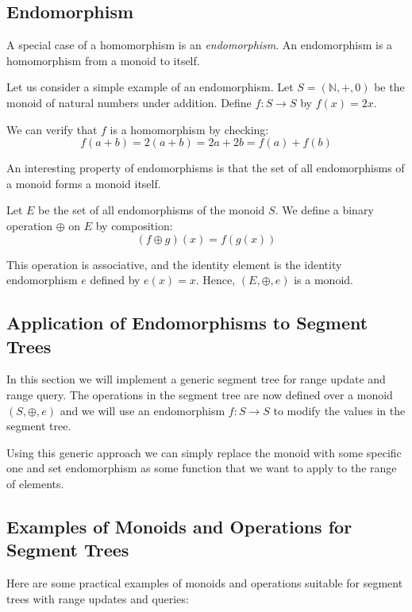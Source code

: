 \documentclass[11pt]{article}
\begin{document}
\subsection{Endomorphism}

A special case of a homomorphism is an \emph{endomorphism}.  
An endomorphism is a homomorphism from a monoid to itself.

Let us consider a simple example of an endomorphism.  
Let \( S = (\mathbb{N}, +, 0) \) be the monoid of natural numbers under addition.  
Define \( f: S \to S \) by \( f(x) = 2x \).

We can verify that \( f \) is a homomorphism by checking:
\[
    f(a + b) = 2(a + b) = 2a + 2b = f(a) + f(b)
\]

An interesting property of endomorphisms is that the set of all endomorphisms of a monoid forms a monoid itself.

Let \( E \) be the set of all endomorphisms of the monoid \( S \).  
We define a binary operation \( \oplus \) on \( E \) by composition:
\[
    (f \oplus g)(x) = f(g(x))
\]

This operation is associative, and the identity element is the identity endomorphism \( e \) defined by \( e(x) = x \).  
Hence, \( (E, \oplus, e) \) is a monoid.

\subsection{Application of Endomorphisms to Segment Trees}
In this section we will implement a generic segment tree for range update and range query.
The operations in the segment tree are now defined over a monoid \( (S, \oplus, e) \) and we will use an endomorphism \( f: S \to S \) to modify the values in the segment tree.



\vspace{0.1cm}
\FloatBarrier
Using this generic approach we can simply replace the monoid with some specific one and
set endomorphism as some function that we want to apply to the range of elements.

\subsection{Examples of Monoids and Operations for Segment Trees}

Here are some practical examples of monoids and operations suitable for segment trees with range updates and queries:
\end{document}
